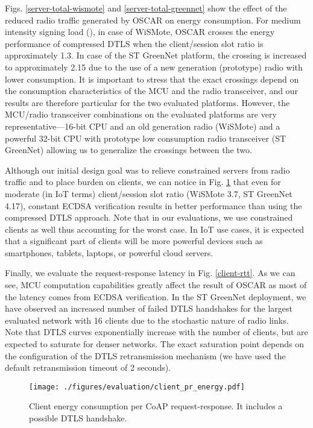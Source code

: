 \documentclass[conference]{IEEEtran}
\begin{document}
Figs. \ref{server-total-wismote} and \ref{server-total-greennet} show the effect
of the reduced radio traffic generated by OSCAR on energy consumption. For
medium intensity signing load (), in case of WiSMote, OSCAR
crosses the energy performance of compressed DTLS when the client/session slot
ratio is approximately 1.3. In case of the ST GreenNet platform, the crossing
is increased to approximately 2.15 due to the use of a new generation
(prototype) radio with lower consumption. It is important to stress that the
exact crossings depend on the consumption characteristics of the MCU and the radio transceiver, and our results are therefore particular for the two evaluated platforms. However, the MCU/radio transceiver combinations on the evaluated platforms are very representative---16-bit CPU and an old generation radio (WiSMote) and a powerful 32-bit CPU with prototype low consumption radio transceiver (ST GreenNet) allowing us to generalize the crossings between the two. 


Although our initial design goal was to relieve constrained servers from radio
traffic and to place burden on clients, we can notice in
Fig. \ref{client-pr-energy} that even for moderate (in IoT terms) client/session
slot ratio (WiSMote 3.7, ST GreenNet 4.17), constant ECDSA verification results
in better performance than using the compressed DTLS approach. Note that in our
evaluations, we use constrained clients as well thus accounting for the
worst case. In IoT use cases, it is expected that a significant part of clients will be more powerful devices such as smartphones, tablets, laptops, or powerful cloud servers.

Finally, we evaluate the request-response latency in
Fig. \ref{client-rtt}. As we can see, MCU computation capabilities greatly
affect the result of OSCAR as most of the latency comes from ECDSA
verification. In the ST GreenNet deployment, we have observed an increased
number of failed DTLS handshakes for the largest evaluated network with 16
clients due to the stochastic nature of radio links. Note that DTLS curves
exponentially increase with the number of clients, but are expected to saturate
for denser networks. The exact saturation point depends on the configuration of
the DTLS retransmission mechanism (we have used the default retransmission timeout of 2 seconds). 

\begin{figure}[htbp]
\centering
\texttt{[image: ./figures/evaluation/client\_pr\_energy.pdf]}
\caption{Client energy consumption per CoAP request-response. It includes a possible DTLS handshake.}
\label{client-pr-energy}
\end{figure}
\end{document}
